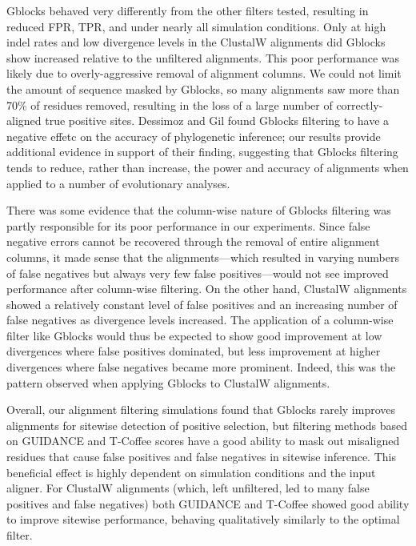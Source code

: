 \documentclass{article}
\begin{document}
Gblocks behaved very differently from the other filters tested,
resulting in reduced FPR, TPR, and \tpr under nearly all simulation
conditions. Only at high indel rates and low divergence levels in the
ClustalW alignments did Gblocks show increased \tpr relative to the
unfiltered alignments. This poor performance was likely due to
overly-aggressive removal of alignment columns. We could not limit the
amount of sequence masked by Gblocks, so many alignments saw more than
70\% of residues removed, resulting in the loss of a large number of
correctly-aligned true positive sites. Dessimoz and Gil
\citeyearpar{Dessimoz2010Phylogenetic} found Gblocks filtering to have
a negative effetc on the accuracy of phylogenetic inference; our
results provide additional evidence in support of their finding,
suggesting that Gblocks filtering tends to reduce, rather than
increase, the power and accuracy of alignments when applied to a
number of evolutionary analyses.

There was some evidence that the column-wise nature of Gblocks
filtering was partly responsible for its poor performance in our
experiments. Since false negative errors cannot be recovered through
the removal of entire alignment columns, it made sense that the
\prankc alignments---which resulted in varying numbers of false
negatives but always very few false positives---would not see improved
performance after column-wise filtering. On the other hand, ClustalW
alignments showed a relatively constant level of false positives and
an increasing number of false negatives as divergence levels
increased. The application of a column-wise filter like Gblocks would
thus be expected to show good improvement at low divergences where
false positives dominated, but less improvement at higher divergences
where false negatives became more prominent. Indeed, this was the
pattern observed when applying Gblocks to ClustalW alignments.

Overall, our alignment filtering simulations found that Gblocks rarely
improves alignments for sitewise detection of positive selection, but
filtering methods based on GUIDANCE and T-Coffee scores have a good
ability to mask out misaligned residues that cause false positives and
false negatives in sitewise inference. This beneficial effect is
highly dependent on simulation conditions and the input aligner. For
ClustalW alignments (which, left unfiltered, led to many false
positives and false negatives) both GUIDANCE and T-Coffee showed good
ability to improve sitewise performance, behaving qualitatively
similarly to the optimal filter.
\end{document}
